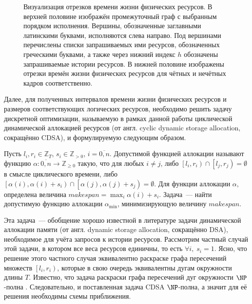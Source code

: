 \begin{figure*}[ht]
\caption{Визуализация отрезков времени жизни физических ресурсов.
В верхней половине изображён промежуточный граф с выбранным порядком исполнения.
Вершины, обозначенные заглавными латинскими буквами, исполняются слева направо.
Под вершинами перечислены списки запрашиваемых ими ресурсов, обозначенных греческими буквами, а также через нижний индекс $h$ обозначены запрашиваемые истории ресурсов.
В нижней половине изображены отрезки времён жизни физических ресурсов для чётных и нечётных кадров соответственно.}
\label{fig:twoFrameLifetime}
\end{figure*}
Далее, для полученных интервалов времени жизни физических ресурсов и размеров соответствующих логических ресурсов, необходимо решить задачу дискретной оптимизации, называемую в рамках данной работы циклической динамической аллокацией ресурсов (от англ. cyclic dynamic storage allocation, сокращённо CDSA), и формулируемую следующим образом.

Пусть $l_i, r_i \in \mathbb{Z}_T$, $s_i \in \mathbb{Z}_{>0}$, $i=\overline{0,n}$.
Допустимой функцией аллокации называют функцию $\alpha : \overline{0,n} \to \mathbb{Z}_{\geqslant 0}$ такую, что для любых $i \neq j$, либо $\left[l_i, r_i\right) \cap \left[l_j, r_j\right) = \emptyset$ в смысле циклического времени, либо $\left[\alpha(i), \alpha(i) + s_i\right) \cap \left[\alpha(j), \alpha(j) + s_j\right) = \emptyset$.
Для функции аллокации $\alpha$, определена величина $makespan = \max_i \alpha(i) + s_i$.
Задача~--- найти допустимую функцию аллокации $\alpha_{\min}$, минимизирующую величину $makespan$.

Эта задача~--- обобщение хорошо известной в литературе задачи динамической аллокации памяти (от англ. dynamic storage allocation, сокращённо DSA), необходимое для учёта запросов к истории ресурсов.
Рассмотрим частный случай этой задачи, в котором все веса ресурсов единичны, то есть $\forall i,\;s_i = 1$.
Ясно, что решение этого частного случая эквивалентно раскраске графа пересечений множеств $\left[l_i, r_i\right)$, которые в свою очередь эквивалентны дугам окружности длины $T$.
Известно, что задача раскраски графа пересечений дуг окружности $\NP$-полна \cite{doi:10.1137/0601025}.
Следовательно, и поставленная задача CDSA $\NP$-полна, а значит для её решения необходимы схемы приближения.

